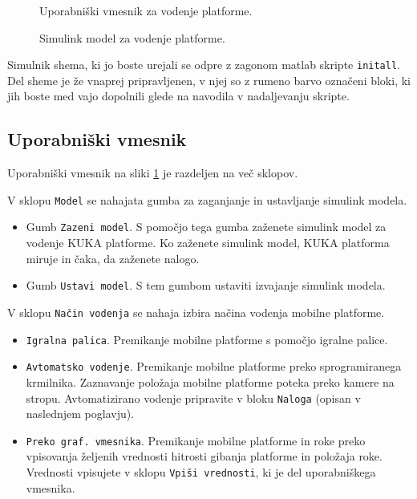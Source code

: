 \begin{figure}[h]
	\centering {}
	\caption{Uporabniški vmesnik za vodenje platforme.}
	\label{fig:GUI}
\end{figure}

\begin{figure}[h]
	\centering {}
	\caption{Simulink model za vodenje platforme.}
	\label{fig:model}
\end{figure}

Simulnik shema, ki jo boste urejali se odpre z zagonom matlab skripte \verb|initall|. Del sheme je že vnaprej pripravljenen, v njej so z rumeno barvo označeni bloki, ki jih boste med vajo dopolnili glede na navodila v nadaljevanju skripte.

\subsection{Uporabniški vmesnik}

Uporabniški vmesnik na sliki \ref{fig:GUI} je razdeljen na več sklopov.

V sklopu \verb"Model" se nahajata gumba za zaganjanje in ustavljanje simulink  modela.
\begin{itemize}
\item Gumb \verb"Zazeni model". S pomočjo tega gumba zaženete simulink model za vodenje KUKA platforme. Ko zaženete simulink model, KUKA platforma miruje in čaka, da zaženete nalogo.
\item Gumb \verb"Ustavi model". S tem gumbom ustaviti izvajanje simulink modela.
\end{itemize}

V sklopu \verb"Način vodenja" se nahaja izbira načina vodenja mobilne platforme.
\begin{itemize}
	\item \verb"Igralna palica". Premikanje mobilne platforme s pomočjo igralne palice.
	\item \verb"Avtomatsko vodenje". Premikanje mobilne platforme preko sprogramiranega krmilnika. Zaznavanje položaja mobilne platforme poteka preko kamere na stropu. Avtomatizirano vodenje pripravite v bloku \verb|Naloga| (opisan v naslednjem poglavju).
	\item \verb"Preko graf. vmesnika". Premikanje mobilne platforme in roke preko vpisovanja željenih vrednosti hitrosti gibanja platforme in položaja roke. Vrednosti vpisujete v sklopu \verb"Vpiši vrednosti", ki je del uporabniškega vmesnika.
\end{itemize}


